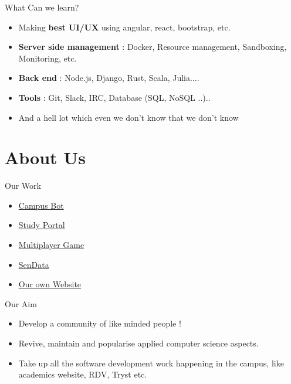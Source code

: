    \begin{frame}{What Can we learn?}
        \begin{itemize}
            \item<+-> Making \textbf{best UI/UX} using angular, react, bootstrap, etc.
            \item<+-> \textbf{Server side management} : Docker, Resource management, Sandboxing, Monitoring, etc.
            \item<+-> \textbf{Back end} : Node.js, Django, Rust, Scala, Julia....
            \item<+-> \textbf{Tools} : Git, Slack, IRC, Database (SQL, NoSQL ..)..
            \item<+-> And a hell lot which even we don’t know that we don’t know
        \end{itemize}
    \end{frame}

\section{About Us}
    \begin{frame}{Our Work}
        \begin{itemize}
            \item<+-> \href{https://aman71197.github.io/CampusBot/}{Campus Bot}
            \item<+-> \href{http://iitd.info/study_portal}{Study Portal}            
            \item<+-> \href{http://10.17.51.99:3000/}{Multiplayer Game}
            \item<+-> \href{http://sendata.herokuapp.com/}{SenData}
            \item<+-> \href{http://www.cse.iitd.ernet.in/devclub/}{Our own Website}
        \end{itemize}
    \end{frame}
    \begin{frame}{Our Aim}
        \begin{itemize}
            \item<+-> Develop a community of like minded people !
            \item<+-> Revive, maintain and popularise applied computer science aspects.            
            \item<+-> Take up all the software development work happening in the campus, like academics website, RDV, Tryst etc.
        \end{itemize}
    \end{frame}
